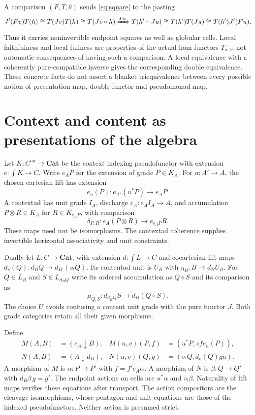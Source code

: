 \documentclass[11pt]{article}
\theoremstyle{definition}
\newcommand{\Cat}{\mathbf{Cat}}
\begin{document}
A comparison $(F,T,\theta)$ sends \eqref{eq:square} to the pasting
\[
 J'(Fv)T(h)\cong T(Jv)T(h)\cong T(Jv\circ h)
 \xRightarrow{T\alpha}T(h'\circ Ju)
 \cong T(h')T(Ju)\cong T(h')J'(Fu).
\]
Thus it carries noninvertible endpoint squares as well as globular cells.
Local faithfulness and local fullness are properties of the actual hom
functors $T_{a,b}$, not automatic consequences of having such a comparison.
A local equivalence with a coherently pure-compatible inverse gives the
corresponding double equivalence. These concrete facts do not assert a
blanket triequivalence between every possible notion of presentation map,
double functor and pseudomonad map.

\section{Context and content as presentations of the algebra}\label{sec:presentations}

Let $K:C^{\mathrm{op}}\to\Cat$ be the context indexing pseudofunctor with
extension $e:\int K\to C$. Write $e_AP$ for the extension of grade $P\in K_A$.
For $u:A'\to A$, the chosen cartesian lift has extension
\[
 e_u(P):e_{A'}(u^*P)\longrightarrow e_AP.
\]
A contextad has unit grade $I_A$, discharge $\varepsilon_A:e_AI_A\to A$,
and accumulation $P\otimes R\in K_A$ for $R\in K_{e_AP}$, with comparison
\[
 \delta_{P,R}:e_A(P\otimes R)\longrightarrow e_{e_AP}R.
\]
These maps need not be isomorphisms. The contextad coherence supplies
invertible horizontal associativity and unit constraints.

Dually let $L:C\to\Cat$, with extension $d:\int L\to C$ and cocartesian
lift maps $d_v(Q):d_BQ\to d_{B'}(v_!Q)$. Its contentad unit is $U_B$ with
$\eta_B:B\to d_BU_B$. For $Q\in L_B$ and $S\in L_{d_BQ}$ write its ordered
accumulation as $Q\diamond S$ and its comparison as
\[
 \mu_{Q,S}:d_{d_BQ}S\longrightarrow d_B(Q\diamond S).
\]
The choice $U$ avoids confusing a content unit grade with the pure functor
$J$. Both grade categories retain all their given morphisms.

Define
\begin{align*}
 M(A,B)&=(e_A\downarrow B),&
 M(u,v)(P,f)&=(u^*P,vf e_u(P)),\\
 N(A,B)&=(A\downarrow d_B),&
 N(u,v)(Q,g)&=(v_!Q,d_v(Q)gu).
\end{align*}
A morphism of $M$ is $\alpha:P\to P'$ with $f=f'e_A\alpha$.
A morphism of $N$ is $\beta:Q\to Q'$ with $d_B\beta\,g=g'$.
The endpoint actions on cells are $u^*\alpha$ and $v_!\beta$.
Naturality of lift maps verifies these equations after transport. The action
compositors are the cleavage isomorphisms, whose pentagon and unit equations
are those of the indexed pseudofunctors. Neither action is presumed strict.
\end{document}

